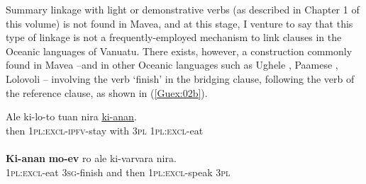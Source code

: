 \documentclass[output=paper]{LSP/langsci}
\begin{document}
Summary linkage with light or demonstrative verbs (as described in Chapter 1 of this volume) is not found in Mavea, and at this stage, I venture to say that this type of linkage is not a frequently-employed mechanism to link clauses in the Oceanic languages of Vanuatu. There exists, however, a construction commonly found in Mavea --and in other Oceanic languages such as Ughele \citep{Frostad2012}, Paamese \citep[][39]{crowley03}, Lolovoli \citep{hyslop01}-- involving the verb `finish' in the bridging clause, following the verb of the reference clause, as shown in (\ref{Guex:02b}).

\begin{exe}
\ex \label{Guex:02ab}
\begin{xlist}
\ex \label{Guex:02a}
\gll Ale    ki-lo-to       tuan   nira \underline{ki-anan}.\\
then  \textsc{1pl:excl-ipfv}-stay   with   \textsc{3pl}  \textsc{1pl:excl}-eat\\
\glt {}\\
\ex \label{Guex:02b}
\gll \textbf{Ki-anan}           \textbf{mo-ev} ro      ale  ki-varvara           nira.\\     	       
    \textsc{1pl:excl}-eat    \textsc{3sg}-finish   and   then  \textsc{1pl:excl-}speak     \textsc{3pl}\\
\glt {} 
\end{xlist}
\end{exe}
\end{document}
